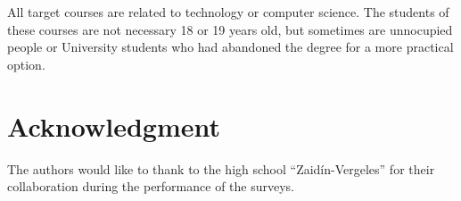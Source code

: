 \documentclass[journal,transmag]{IEEEtran}
\begin{document}
All target courses are related to technology or computer science. The students of these courses are not necessary 18 or 19 years old, but sometimes are unnocupied people or University students who had abandoned the degree for a more practical option.

\section*{Acknowledgment}

The authors would like to thank to the high school ``Zaid\'{i}n-Vergeles'' for their collaboration during the performance of the surveys.


\ifCLASSOPTIONcaptionsoff
  \newpage
\fi





%
%
%



% 
\end{document}
